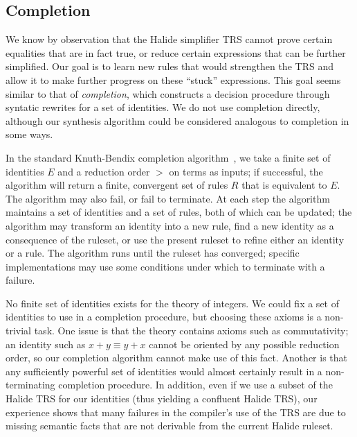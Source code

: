 \subsection{Completion}
\label{sec:completion}

We know by observation that the Halide simplifier TRS cannot prove certain equalities 
that are in fact true, or reduce certain expressions that can be further simplified. 
Our goal is to learn new rules that would strengthen the TRS and allow it to make
further progress on these ``stuck'' expressions. This goal seems similar to that of 
\emph{completion}, which constructs a decision procedure through syntatic rewrites
for a set of identities. We do not use completion directly, although
our synthesis algorithm could be considered analogous to completion in some ways.

In the standard Knuth-Bendix completion algorithm~\citep{knuth1983simple}, we take a
finite set of identities $E$ and a reduction order $>$ on terms as inputs; if successful, the
algorithm will return a finite, convergent set of rules $R$ that is equivalent to 
$E$. The algorithm may also fail, or fail to terminate. At each step the algorithm
maintains a set of identities and a set of rules, both of which can be updated; the 
algorithm may transform an identity into a new rule, find a new identity as a 
consequence of the ruleset, or use the present ruleset to refine either an identity 
or a rule. The algorithm runs until the ruleset has converged; specific implementations
may use some conditions under which to terminate with a failure.

No finite set of identities exists for the theory of integers. We could
fix a set of identities to use in a completion procedure, but choosing these axioms
is a non-trivial task. One issue is that the theory contains axioms such as commutativity;
an identity such as $x + y \equiv y + x$ cannot be oriented by any possible reduction 
order, so our completion algorithm cannot make use of this fact. Another is that any
sufficiently powerful set of identities would almost certainly result in a non-terminating
completion procedure.  In addition, even if we use a subset of the Halide TRS for our
identities (thus yielding a confluent Halide TRS), our experience shows that many
failures in the compiler's use of the TRS are due to missing semantic facts that are not
derivable from the current Halide ruleset.


